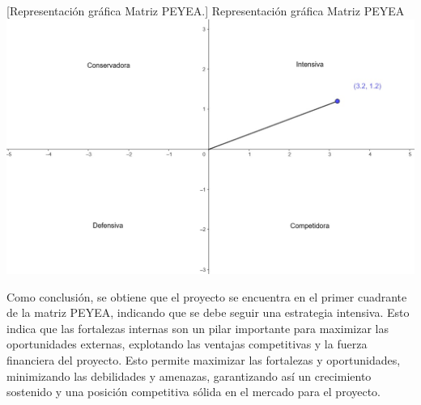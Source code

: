 \vspace{2mm}
\begin{minipage}{0.9\textwidth}
\centering
{}[{Representación gráfica Matriz PEYEA.}]{ Representación gráfica Matriz PEYEA }
\label{peyeagrafico}
\includegraphics[width=1\textwidth]{Content/Images/PEYEA.jpeg}
\end{minipage}

Como conclusión, se obtiene que el proyecto se encuentra en el primer cuadrante de la matriz PEYEA, indicando que se debe seguir una estrategia intensiva. Esto indica que las fortalezas internas son un pilar importante para maximizar las oportunidades externas, explotando las ventajas competitivas y la fuerza financiera del proyecto. Esto permite maximizar las fortalezas y oportunidades, minimizando las debilidades y amenazas, garantizando así un crecimiento sostenido y una posición competitiva sólida en el mercado para el proyecto.
